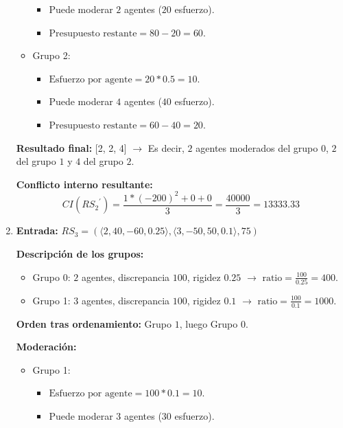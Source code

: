 \begin{enumerate}
\begin{itemize}
\begin{itemize}
				\item Puede moderar $2$ agentes ($20$ esfuerzo).

				\item $\text{Presupuesto restante} = 80 - 20 = 60$.
			\end{itemize}
		\item Grupo 2:
			\begin{itemize}
				\item $\text{Esfuerzo por agente} = 20 * 0.5 = 10$.

				\item Puede moderar $4$ agentes ($40$ esfuerzo).

				\item $\text{Presupuesto restante} = 60 - 40 = 20$.
			\end{itemize}
	\end{itemize}

	\textbf{Resultado final:} [2, 2, 4] $\rightarrow$ Es decir, $2$ agentes moderados del grupo $0$, $2$ del grupo $1$ y $4$ del grupo $2$.

	\textbf{Conflicto interno resultante:}
	\begin{equation}
		CI\left( { RS_2 }^\prime \right) = \frac{ 1 * (-200)^2 + 0 + 0 }{ 3 } = \frac{ 40000 }{ 3 } = 13333.33
	\end{equation}

	\item \textbf{Entrada:} $RS_3 = (\langle 2,40,-60,0.25 \rangle,\langle 3,-50,50,0.1 \rangle,75)$

		\textbf{Descripción de los grupos:}
			\begin{itemize}
				\item Grupo 0: $2$ agentes, discrepancia $100$, rigidez $0.25$ $\rightarrow$ $\text{ratio} = \frac{ 100 }{ 0.25 } = 400$.

				\item Grupo 1: $3$ agentes, discrepancia $100$, rigidez $0.1$ $\rightarrow$ $\text{ratio} = \frac{ 100 }{ 0.1 } = 1000$.
			\end{itemize}

		\textbf{Orden tras ordenamiento:} Grupo $1$, luego Grupo $0$.

		\textbf{Moderación:}
		\begin{itemize}
			\item Grupo 1:
				\begin{itemize}
					\item $\text{Esfuerzo por agente} = 100 * 0.1 = 10$.

					\item Puede moderar $3$ agentes ($30$ esfuerzo).


\end{itemize}
\end{itemize}
\end{enumerate}
